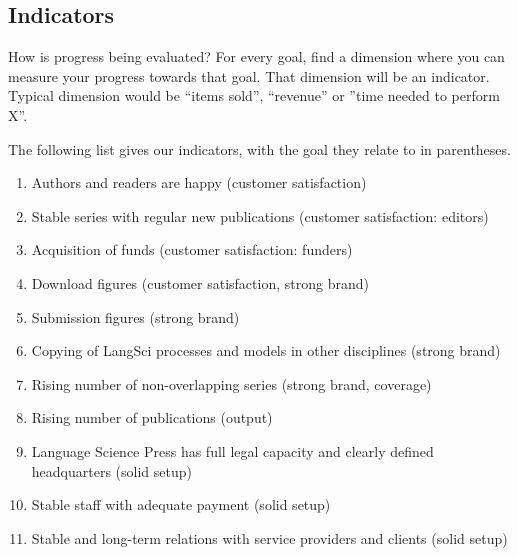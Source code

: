 \documentclass[nonflat,smallfont
]{langsci/langscibook}
\newcommand{\background}[1]{ 
  \vspace{5mm}
  \renewcommand{\tblslinecolour}{lsDarkBlue}
  \tblssy[red]{explore2}{Background}{\vspace*{-5mm}#1}
}
\newcommand{\langscisolution}[1]{
  \renewcommand{\tblslinecolour}{lsLightBlue}
  \tblssy{langsci}{LangSci solution}{\vspace*{-5mm}#1}
}
\renewcommand{\tblssy}[4][black!12]{%
  \renewcommand{\langscisymbol}{#2}\renewcommand{\tblsboxcolor}{#1}
  \begin{mdframed}[style=yellowexercise,frametitle={#3}]
    #4
  \end{mdframed}
}
\begin{document}
\subsection{Indicators}
\vspace*{5mm}\background{How is progress being evaluated? For every goal, find a dimension where you can measure your progress towards that goal. That dimension will be an indicator. Typical dimension would be ``items sold'', ``revenue'' or ''time needed to perform X''.}
\langscisolution{
The following list gives our indicators, with the goal they relate to in parentheses.
\begin{enumerate}
\sloppy
\item Authors and readers are happy (customer satisfaction) 
\item Stable series with regular new publications (customer satisfaction: editors)
\item Acquisition of funds  (customer satisfaction: funders)
\item Download figures  (customer satisfaction, strong brand) 
\item Submission figures (strong brand)
\item Copying of LangSci processes and models in other disciplines (strong brand)
\item Rising number of non-overlapping series (strong brand, coverage)
\item Rising number of publications (output)
\item Language Science Press has full legal capacity and clearly defined headquarters (solid setup)
\item Stable staff with adequate payment (solid setup)
\item Stable and long-term relations with service providers and clients (solid setup)
\end{enumerate} 
}
\end{document}
